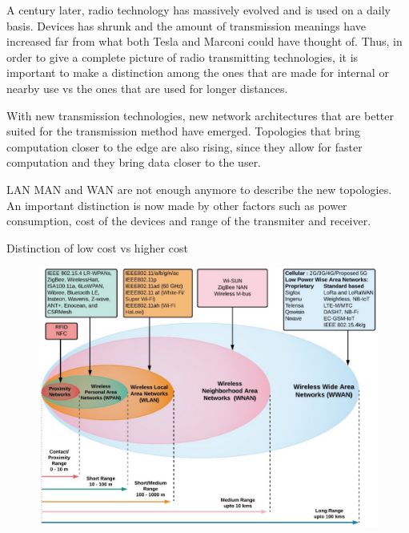 	A century later, radio technology has massively evolved and is used on a daily basis.
	Devices has shrunk and the amount of transmission meanings have increased far from what both Tesla and Marconi could have thought of.
	Thus, in order to give a complete picture of radio transmitting technologies, it is important to make a distinction among the ones that are made for internal or nearby use vs the ones that are used for longer distances.
	
	
	With new transmission technologies, new network architectures that are better suited for the transmission method have emerged.
	Topologies that bring computation closer to the edge are also rising, since they allow for faster computation and they bring data closer to the user.
	
	LAN MAN and WAN are not enough anymore to describe the new topologies.
	An important distinction is now made by other factors such as power consumption, cost of the devices and range of the transmiter and receiver.
	
	
	Distinction of low cost vs higher cost
	
	\begin{figure}
		\centering
		\includegraphics[height=\textwidth, angle=90]{resources/img/iot_range}
		\caption{}
	\end{figure}
		
